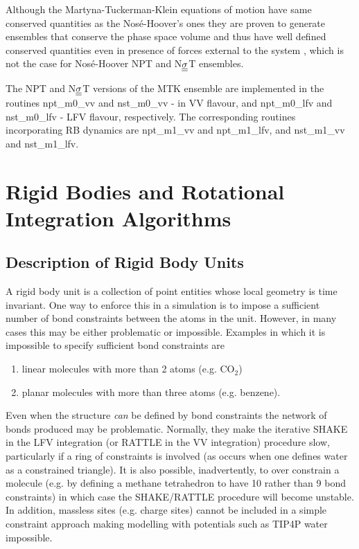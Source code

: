 Although the Martyna-Tuckerman-Klein equations of motion have same
conserved quantities as the Nos\'e-Hoover's ones they are proven
to generate ensembles that conserve the phase space volume and
thus have well defined conserved quantities even in presence of
forces external to the system \cite{martyna-94a}, which is not
the case for Nos\'{e}-Hoover NPT and N$\mbox{$\underline{\underline{\bf \sigma}}$}$T ensembles.

The NPT and N$\mbox{$\underline{\underline{\bf \sigma}}$}$T versions of the MTK ensemble are
implemented in the \D routines {\sc npt\_m0\_vv} and
{\sc nst\_m0\_vv} - in VV flavour, and {\sc npt\_m0\_lfv}
and {\sc nst\_m0\_lfv} - LFV flavour, respectively.
The corresponding routines incorporating RB dynamics are
{\sc npt\_m1\_vv} and {\sc npt\_m1\_lfv}, and {\sc nst\_m1\_vv} and {\sc nst\_m1\_lfv}.

\section{Rigid Bodies and Rotational Integration Algorithms}
\label{rigid}

\subsection{Description of Rigid Body Units}

A rigid body unit is a collection of point entities whose local geometry
is time invariant.  One way to enforce this in a simulation is to
impose a sufficient number of bond constraints between the atoms in
the unit.  However, in many cases this may be either problematic or
impossible.  Examples in which it is impossible to specify sufficient
bond constraints are
\begin{enumerate}
\item linear molecules with more than 2 atoms (e.g. CO$_2$)
\item planar molecules with more than three atoms (e.g. benzene).
\end{enumerate}
Even when the structure {\em can} be defined by bond
constraints the network of bonds produced
may be problematic.  Normally, they make the iterative SHAKE in the
LFV integration (or RATTLE in the VV integration) procedure slow,
particularly if a ring of constraints is involved (as occurs when
one defines water as a constrained triangle).  It is also possible,
inadvertently, to over constrain a molecule (e.g. by defining a
methane tetrahedron to have 10 rather than 9 bond constraints)
in which case the SHAKE/RATTLE procedure will become unstable.
In addition, massless sites (e.g. charge sites) cannot be included
in a simple constraint approach making modelling with potentials
such as TIP4P water impossible.

